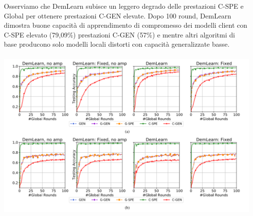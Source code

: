 Osserviamo che DemLearn subisce un leggero degrado delle prestazioni C-SPE e Global per ottenere prestazioni C-GEN elevate. Dopo 100 round, DemLearn dimostra buone capacità di apprendimento di compromesso dei modelli client con C-SPE elevato (79,09\%) prestazioni C-GEN (57\%) e mentre altri algoritmi di base producono solo modelli locali distorti con capacità generalizzate basse.\\\\
\includegraphics[scale=0.5]{AlgoStructureComp}

